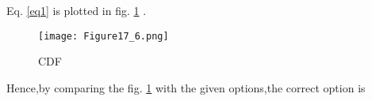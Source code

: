 \documentclass[journal,12pt,twocolumn]{IEEEtran}
\begin{document}
Eq. \eqref{eq1} is plotted in fig. \ref{CDF} .

\begin{figure}[!ht]
\centering
\texttt{[image: Figure17\_6.png]}
\caption{CDF}
\label{CDF}	
\end{figure}

Hence,by comparing the fig. \ref{CDF} with the given options,the correct option is 
\end{document}
